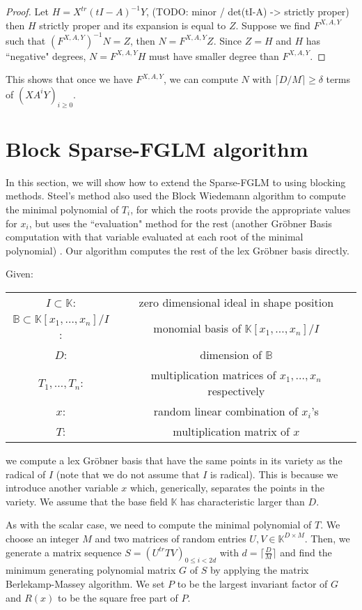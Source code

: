 \documentclass[12pt]{article}
\def\K {\ensuremath{\mathbb{K}}}
\def\K{\mathbb{K}}
\begin{document}
\begin{proof}
	Let $H = X^{tr} (tI - A)^{-1} Y$,
	(TODO: minor / det(tI-A) -> strictly proper) 
	then $H$ strictly proper
	and its expansion is equal to $Z$. Suppose we find
	$F^{X,A,Y}$ such that $(F^{X,A,Y})^{-1} N = Z$, then
	$N = F^{X,A,Y}Z$. Since $Z = H$ and $H$ has ``negative"
	degrees, $N = F^{X,A,Y}H$ must have smaller degree
	than $F^{X,A,Y}$.
\end{proof}

\noindent This shows that once we have $F^{X,A,Y}$, we can compute
$N$ with $\lceil D / M \rceil \ge \delta$ terms of $(XA^iY)_{i \ge 0}$.


\newpage
\section{Block Sparse-FGLM algorithm}
In this section, we will show how to extend the Sparse-FGLM
to using blocking methods. Steel's method also used the
Block Wiedemann algorithm to compute the minimal polynomial
of $T_i$, for which the roots provide the appropriate
values for $x_i$,
but uses the ``evaluation" method for the rest
(another Gr\"obner Basis computation with that variable
evaluated at each root of the minimal polynomial) \cite{Steel15}.
Our algorithm computes the rest of the lex
Gr\"obner basis directly.

Given:
\begin{center}
	\begin{tabular}{c c}
		$I \subset \mathbb{K}$:& zero dimensional ideal
		in shape position\\
		$\mathbb{B} \subset \mathbb{K}[x_1,\dots,x_n]/I$:&
		monomial basis of $\mathbb{K}[x_1,\dots,x_n]/I$\\
		$D$: & dimension of $\mathbb{B}$\\
		$T_1, \dots,T_n$:& multiplication matrices of
		$x_1 ,\dots,x_n$ respectively\\
		$x$:& random linear combination of $x_i$'s\\
		$T$:& multiplication matrix of $x$
	\end{tabular}
\end{center}
we compute a lex Gr\"obner basis that have the same points
in its variety as the radical of $I$ 
(note that we do not assume that $I$ is radical).
This is because we introduce another variable $x$ which,
generically, separates the points in the variety.
We assume that the base field $\K$ has characteristic
larger than $D$.

As with the scalar case, we need to compute the minimal polynomial
of $T$. We choose an integer $M$ and two matrices of random
entries $U,V \in \K^{D\times M}$. Then, we generate a matrix
sequence $S = (U^{tr}TV)_{0 \le i < 2d}$ with
$d = \lceil \frac{D}{M} \rceil$ and find the minimum generating
polynomial matrix $G$ of $S$ by applying the matrix
Berlekamp-Massey algorithm. We set $P$ to be the largest
invariant factor of $G$ and $R(x)$ to
be the square free part of $P$.
\end{document}
